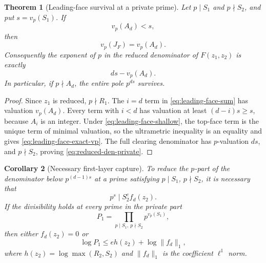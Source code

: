 \documentclass[11pt,oneside]{article}
\newtheorem{theorem}{Theorem}[section]
\newtheorem{corollary}[theorem]{Corollary}
\theoremstyle{definition}
\theoremstyle{remark}
\begin{document}
\begin{theorem}[Leading-face survival at a private prime]
\label{thm:leading-face-survival}
Let $p\mid S_1$ and $p\nmid S_2$, and put $s=v_p(S_1)$.  If
\begin{equation}
 v_p(A_d)<s,
 \label{eq:leading-face-shallow}
\end{equation}
then
\begin{equation}
 v_p(J_F)=v_p(A_d).
 \label{eq:leading-face-exact-vp}
\end{equation}
Consequently the exponent of $p$ in the reduced denominator of $F(z_1,z_2)$ is exactly
\begin{equation}
 d s-v_p(A_d).
 \label{eq:reduced-den-private}
\end{equation}
In particular, if $p\nmid A_d$, the entire pole $p^{ds}$ survives.
\end{theorem}

\begin{proof}
Since $z_1$ is reduced, $p\nmid R_1$.  The $i=d$ term in
\eqref{eq:leading-face-sum} has valuation $v_p(A_d)$.  Every term with $i<d$ has valuation at
least $(d-i)s\ge s$, because $A_i$ is an integer.  Under
\eqref{eq:leading-face-shallow}, the top-face term is the unique term of minimal valuation,
so the ultrametric inequality is an equality and gives
\eqref{eq:leading-face-exact-vp}.  The full clearing denominator has $p$-valuation $ds$,
and $p\nmid S_2$, proving \eqref{eq:reduced-den-private}.
\end{proof}

\begin{corollary}[Necessary first-layer capture]
\label{cor:first-layer-capture}
To reduce the $p$-part of the denominator below $p^{(d-1)s}$ at a prime satisfying
$p\mid S_1$, $p\nmid S_2$, it is necessary that
\begin{equation}
 p^s\mid S_2^e f_d(z_2).
 \label{eq:first-layer-capture}
\end{equation}
If the divisibility holds at every prime in the private part
\begin{equation}
 P_1=\prod_{p\mid S_1,\ p\nmid S_2}p^{v_p(S_1)},
 \label{eq:private-part}
\end{equation}
then either $f_d(z_2)=0$ or
\begin{equation}
 \log P_1
 \le e h(z_2)+\log\|f_d\|_1,
 \label{eq:first-layer-height-budget}
\end{equation}
where $h(z_2)=\log\max(R_2,S_2)$ and $\|f_d\|_1$ is the coefficient $\ell^1$ norm.
\end{corollary}
\end{document}
